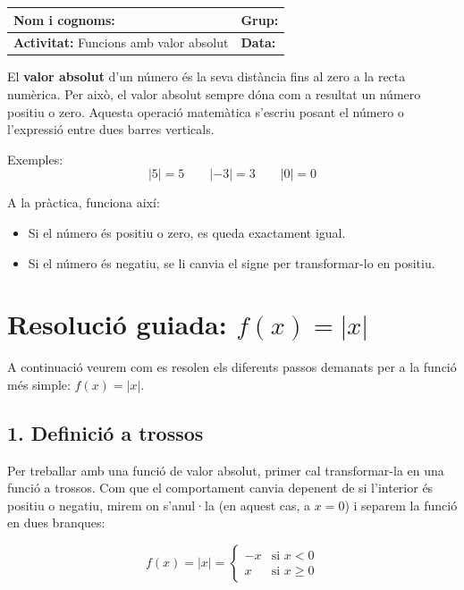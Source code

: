 \documentclass[12pt,a4paper]{article}
\begin{document}
\begingroup
\renewcommand{\arraystretch}{2.2}
\begin{tabularx}{\textwidth}{|X|p{4cm}|}
\hline
\textbf{Nom i cognoms:} & \textbf{Grup:} \\ \hline
\textbf{Activitat:} Funcions amb valor absolut & \textbf{Data:} \\ \hline
\end{tabularx}
\endgroup

\vspace{0.5cm}


El \textbf{valor absolut} d'un número és la seva distància fins al zero a la recta numèrica. Per això, el valor absolut sempre dóna com a resultat un número positiu o zero. Aquesta operació matemàtica s'escriu posant el número o l'expressió entre dues barres verticals.

Exemples:
\[
|5|=5 \qquad |-3|=3 \qquad |0|=0
\]

A la pràctica, funciona així:
\begin{itemize}
    \item Si el número és positiu o zero, es queda exactament igual.
    \item Si el número és negatiu, se li canvia el signe per transformar-lo en positiu.
\end{itemize}

\vspace{0.5cm}
\section*{Resolució guiada: $f(x)=|x|$}

A continuació veurem com es resolen els diferents passos demanats per a la funció més simple: $f(x)=|x|$.

\subsection*{1. Definició a trossos}
Per treballar amb una funció de valor absolut, primer cal transformar-la en una funció a trossos. Com que el comportament canvia depenent de si l'interior és positiu o negatiu, mirem on s'anul·la (en aquest cas, a $x=0$) i separem la funció en dues branques:

\[
f(x)=|x|=
\begin{cases}
-x & \text{si } x<0\\[4pt]
x & \text{si } x\geq 0
\end{cases}
\]
\end{document}
